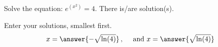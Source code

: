 \documentclass{ximera}
\begin{document}
\begin{exercise}
	Solve the equation:  $e^{(x^2)} = 4$.
	There is/are  solution(s).
	\begin{exercise}
		Enter your solutions, smallest first.  
		\[ x = \answer{-\sqrt{\ln(4)}} \, , \quad \text{ and } x = \answer{\sqrt{\ln(4)}} \]
	\end{exercise}

\end{exercise}
\end{document}
